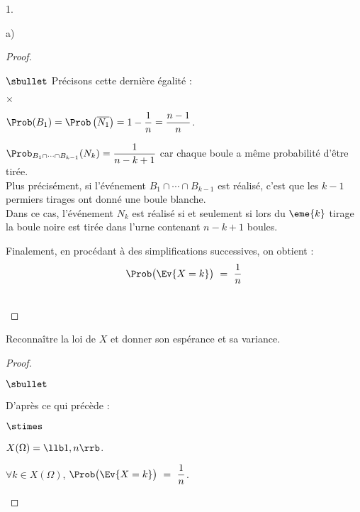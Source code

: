 \documentclass[11pt]{article}%
\begin{document}
\begin{noliste}{1.}
\begin{noliste}{a)}
\begin{proof}
\begin{noliste}{$\sbullet$}
        Précisons cette dernière égalité : 
        \begin{noliste}{$\times$}
        \item $\Prob(B_1) = \Prob\left( \overline{N_1} \right) = 1 -
          \dfrac{1}{n} = \dfrac{n-1}{n}$.

        \item $\Prob_{B_1 \cap \cdots \cap B_{k-1}}(N_{k}) =
          \dfrac{1}{n - k +1}$ car chaque boule a même probabilité
          d'être tirée.\\[.2cm]
          Plus précisément, si l'événement $B_1 \cap \cdots \cap
          B_{k-1}$ est réalisé, c'est que les $k-1$ permiers tirages
          ont donné une boule blanche.\\[.1cm]
          Dans ce cas, l'événement $N_k$ est réalisé si et seulement
          si lors du $\eme{k}$ tirage la boule noire est tirée dans
          l'urne contenant $n - k +1$ boules.
        \end{noliste}
        Finalement, en procédant à des simplifications successives, on
        obtient :
        \[
        \Prob\big( \Ev{X = k} \big) \ = \ \dfrac{1}{n}
        \]        
      \end{noliste}
      ~\\[-1.4cm]
    \end{proof}

  \item Reconnaître la loi de $X$ et donner son espérance et sa
    variance.    

    \begin{proof}~%
      \begin{noliste}{$\sbullet$}
      \item D'après ce qui précède :
        \begin{noliste}{$\stimes$}
        \item $X(\Omega) = \llb 1, n \rrb$.
        \item $\forall k \in X(\Omega)$, $\Prob\big( \Ev{X = k} \big)
          \ = \ \dfrac{1}{n}$.
        \end{noliste}


\end{noliste}
\end{proof}
\end{noliste}
\end{noliste}
\end{document}

